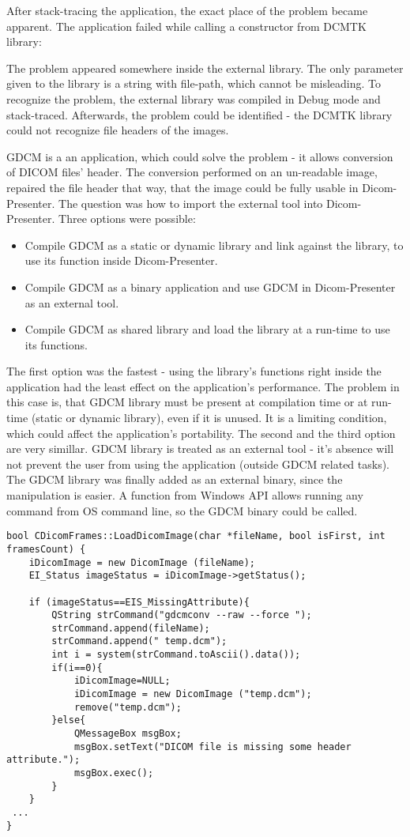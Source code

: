 After stack-tracing the application, the exact place of the problem became apparent. The application failed while calling a constructor from DCMTK library:


The problem appeared somewhere inside the external library. The only parameter given to the library is a string with file-path, which cannot be misleading. To recognize the problem, the external library was compiled in Debug mode and stack-traced. Afterwards, the problem could be identified - the DCMTK library could not recognize file headers of the images.

GDCM is a an application, which could solve the problem - it allows conversion of DICOM files' header. The conversion performed on an un-readable image, repaired the file header that way, that the image could be fully usable in Dicom-Presenter. The question was how to import the external tool into Dicom-Presenter. Three options were possible:

\begin{itemize}
\item Compile GDCM as a static or dynamic library and link against the library, to use its function inside Dicom-Presenter.
\item Compile GDCM as a binary application and use GDCM in Dicom-Presenter as an external tool.
\item Compile GDCM as shared library and load the library at a run-time to use its functions.
\end{itemize}

The first option was the fastest - using the library's functions right inside the application had the least effect on the application's performance. The problem in this case is, that GDCM library must be present at compilation time or at run-time (static or dynamic library), even if it is unused. It is a limiting condition, which could affect the application's portability. The second and the third option are very simillar. GDCM library is treated as an external tool - it's absence will not prevent the user from using the application (outside GDCM related tasks). The GDCM library was finally added as an external binary, since the manipulation is easier. A  function from Windows  API allows running any command from OS command line, so the GDCM binary could be called.

\begin{lstlisting}[caption={A conversion of DICOM files header using GDCM as external tool.}]
bool CDicomFrames::LoadDicomImage(char *fileName, bool isFirst, int framesCount) {
	iDicomImage = new DicomImage (fileName);
	EI_Status imageStatus = iDicomImage->getStatus();

	if (imageStatus==EIS_MissingAttribute){			
		QString strCommand("gdcmconv --raw --force ");
		strCommand.append(fileName);
		strCommand.append(" temp.dcm");
		int i = system(strCommand.toAscii().data());
		if(i==0){
			iDicomImage=NULL;
			iDicomImage = new DicomImage ("temp.dcm");
			remove("temp.dcm");
		}else{
			QMessageBox msgBox;
			msgBox.setText("DICOM file is missing some header attribute.");
			msgBox.exec();
		}		
	}
 ...
}
\end{lstlisting}